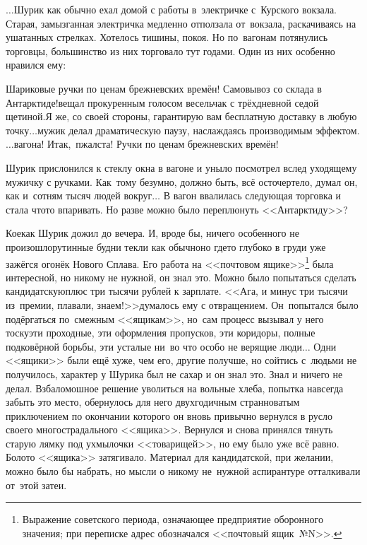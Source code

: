 {%
	$\ldots$Шурик как обычно ехал домой с работы в~электричке с~Курского вокзала. Старая, замызганная электричка медленно отползала от~вокзала, раскачиваясь на ушатанных стрелках. Хотелось тишины, покоя. Но по~вагонам потянулись торговцы, большинство из них торговало тут годами. Один из них особенно нравился ему:
	
	\diagdash Шариковые ручки по ценам брежневских времён! Самовывоз со склада в Антарктиде!\mdash вещал прокуренным голосом весельчак с трёхдневной седой щетиной.\mdash Я же, со своей стороны, гарантирую вам бесплатную доставку в любую точку$\ldots$\mdash мужик делал драматическую паузу, наслаждаясь производимым эффектом.\mdash $\ldots$вагона! Итак,~пжалста! Ручки по ценам брежневских времён!%
	
	Шурик прислонился к стеклу окна в вагоне и уныло посмотрел вслед уходящему мужичку с ручками. Как~тому безумно, должно быть, всё осточертело, думал он, как и~сотням тысяч людей вокруг$\ldots$ В вагон ввалилась следующая торговка и стала что\sdash то впаривать. Но разве можно было переплюнуть <<Антарктиду>>? 
	
	Кое\sdash как Шурик дожил до вечера. И, вроде бы, ничего особенного не произошло\mdash рутинные будни текли как обычно\mdash но где\sdash то глубоко в груди уже зажёгся огонёк Нового Сплава. Его работа на <<почтовом ящике>>\footnote{Выражение советского периода, означающее предприятие оборонного значения; при переписке адрес обозначался <<почтовый ящик~№N>>.} была интересной, но никому не нужной, он знал это. Можно было попытаться сделать кандидатскую\mdash плюс три тысячи рублей к зарплате. <<Ага, и минус три тысячи из~премии, плавали, знаем!>>\mdash думалось ему с отвращением. Он~попытался было подёргаться по~смежным <<ящикам>>, но~сам процесс вызывал у него тоску\mdash эти проходные, эти оформления пропусков, эти коридоры, полные подковёрной борьбы, эти усталые ни~во что особо не верящие люди$\ldots$ Одни <<ящики>> были ещё хуже, чем его, другие получше, но сойтись с~людьми не получилось, характер у Шурика был не сахар и он знал это. Знал и ничего не делал. Взбаломошное решение уволиться на вольные хлеба, попытка навсегда забыть это место, обернулось для него двухгодичным странноватым приключением по окончании которого он вновь привычно вернулся в русло своего многострадального <<ящика>>. Вернулся и снова принялся тянуть старую лямку под ухмылочки <<товарищей>>, но ему было уже всё равно. Болото <<ящика>> затягивало. Материал для кандидатской, при желании, можно было бы набрать, но мысли о никому не~нужной аспирантуре отталкивали от~этой затеи.%
	
}
